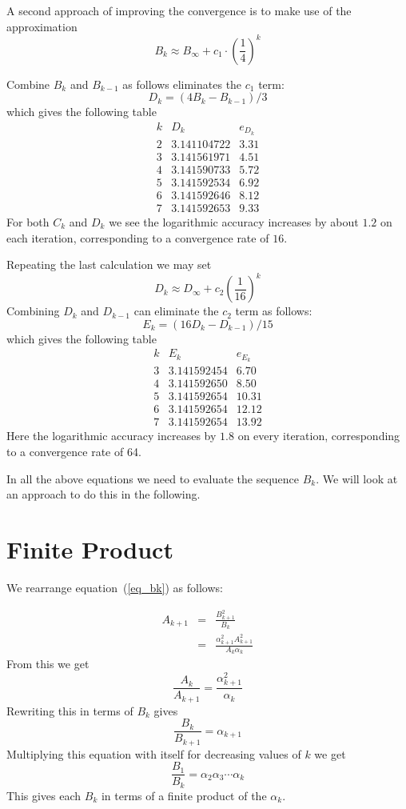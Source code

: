 \documentclass[12pt,oneside,a4paper]{article}
\begin{document}
A second approach of improving the convergence is to make use of the approximation
$$
B_k \approx B_\infty + c_1\cdot \left(\frac14\right)^k
$$

Combine $B_k$ and $B_{k-1}$ as follows eliminates the $c_1$ term:
$$
D_k = (4 B_k - B_{k-1})/3
$$
which gives the following table
$$
\begin{array}{r|c|l|l|l|l}
    k & D_k & e_{D_k}\\ \hline
    2 & 3.141104722 & 3.31 \\ \hline
    3 & 3.141561971 & 4.51 \\ \hline
    4 & 3.141590733 & 5.72 \\ \hline
    5 & 3.141592534 & 6.92 \\ \hline
    6 & 3.141592646 & 8.12 \\ \hline
    7 & 3.141592653 & 9.33
\end{array}
$$
For both $C_k$ and $D_k$ we see the logarithmic accuracy increases by about $1.2$ on each iteration, corresponding to a
convergence rate of $16$.

Repeating the last calculation we may set
$$
D_k \approx D_\infty + c_2 \left(\frac{1}{16}\right)^k
$$
Combining $D_k$ and $D_{k-1}$ can eliminate the $c_2$ term as follows:
$$
E_k = (16 D_k - D_{k-1}) / 15
$$
which gives the following table
$$
\begin{array}{r|c|l|l|l|l}
    k & E_k & e_{E_k}\\ \hline
    3 & 3.141592454 & 6.70 \\ \hline
    4 & 3.141592650 & 8.50 \\ \hline
    5 & 3.141592654 & 10.31 \\ \hline
    6 & 3.141592654 & 12.12 \\ \hline
    7 & 3.141592654 & 13.92
\end{array}
$$
Here the logarithmic accuracy increases by $1.8$ on every iteration, corresponding to a convergence rate of 64.

In all the above equations we need to evaluate the sequence $B_k$. We will look at an approach to do this in the
following.

\section{Finite Product}
We rearrange equation~(\ref{eq_bk}) as follows:

\begin{eqnarray*}
    A_{k+1} &=& \frac{B_{k+1}^2}{B_k} \\
    &=& \frac{\alpha_{k+1}^2 A_{k+1}^2}{A_k \alpha_k}
\end{eqnarray*}
From this we get
$$
\frac{A_k}{A_{k+1}} = \frac{\alpha_{k+1}^2}{\alpha_k}
$$
Rewriting this in terms of $B_k$ gives
$$
\frac{B_k}{B_{k+1}} = \alpha_{k+1}
$$
Multiplying this equation with itself for decreasing values of $k$ we get
$$
\frac{B_1}{B_k} = \alpha_2 \alpha_3 \cdots \alpha_k
$$
This gives each $B_k$ in terms of a finite product of the $\alpha_k$.
\end{document}
